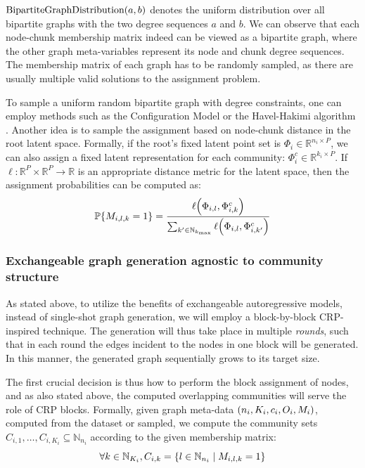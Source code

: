 $\text{BipartiteGraphDistribution}\mathopen{}\left(a,b\right)$ denotes the uniform distribution over all bipartite graphs with the two degree sequences $a$ and $b$. We can observe that each node-chunk membership matrix indeed can be viewed as a bipartite graph, where the other graph meta-variables represent its node and chunk degree sequences. The membership matrix of each graph has to be randomly sampled, as there are usually multiple valid solutions to the assignment problem. 
    
To sample a uniform random bipartite graph with degree constraints, one can employ methods such as the Configuration Model \cite{newman_structure_2003} or the Havel-Hakimi algorithm \cite{hakimi_realizability_1963, kleitman_algorithms_1973}. Another idea is to sample the assignment based on node-chunk distance in the root latent space. Formally, if the root's fixed latent point set is $\Phi_i \in \mathbb{R}^{n_i \times P}$, we can also assign a fixed latent representation for each community: $\Phi^c_i \in \mathbb{R}^{k_i \times P}$. If $\ell: \mathbb{R}^{P} \times \mathbb{R}^{P} \to \mathbb{R}$ is an appropriate distance metric for the latent space, then the assignment probabilities can be computed as: $$\mathbb{P}\mathopen{}\left\{M_{i,l,k}=1\right\}=\frac{\ell\mathopen{}\left(\Phi_{i,l},\Phi^c_{i,k}\right)}{\sum_{k' \in \mathbb{N}_{k_{\max}}}{\ell\mathopen{}\left(\Phi_{i,l},\Phi^c_{i,k'}\right)}}$$

\subsubsection{Exchangeable graph generation agnostic to community structure}
As stated above, to utilize the benefits of exchangeable autoregressive models, instead of single-shot graph generation, we will employ a block-by-block CRP-inspired technique. The generation will thus take place in multiple \emph{rounds}, such that in each round the edges incident to the nodes in one block will be generated. In this manner, the generated graph sequentially grows to its target size.

The first crucial decision is thus how to perform the block assignment of nodes, and as also stated above, the computed overlapping communities will serve the role of CRP blocks. Formally, given graph meta-data $\mathopen{}\left(n_i, K_i, c_i, O_i, M_i\right)$, computed from the dataset or sampled, we compute the community sets $C_{i,1},\dots,C_{i,K_i} \subseteq \mathbb{N}_{n_i}$ according to the given membership matrix: $$\forall k \in \mathbb{N}_{K_i},C_{i,k}=\mathopen{}\left\{l \in \mathbb{N}_{n_i} \mid M_{i,l,k} = 1\right\}$$

